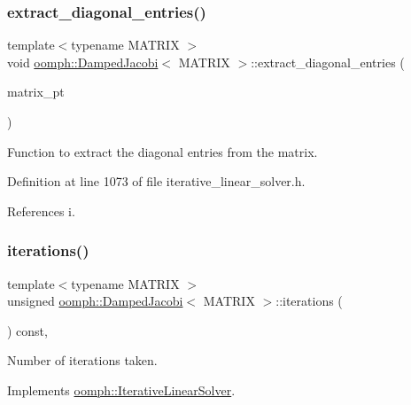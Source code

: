 \subsubsection{\texorpdfstring{extract\+\_\+diagonal\+\_\+entries()}{extract\_diagonal\_entries()}}
{\footnotesize\ttfamily template$<$typename M\+A\+T\+R\+IX $>$ \\
void \hyperlink{classoomph_1_1DampedJacobi}{oomph\+::\+Damped\+Jacobi}$<$ M\+A\+T\+R\+IX $>$\+::extract\+\_\+diagonal\+\_\+entries (\begin{DoxyParamCaption}\item[{\hyperlink{classoomph_1_1DoubleMatrixBase}{Double\+Matrix\+Base} $\ast$}]{matrix\+\_\+pt }\end{DoxyParamCaption})\hspace{0.3cm}{\ttfamily [inline]}}



Function to extract the diagonal entries from the matrix. 



Definition at line 1073 of file iterative\+\_\+linear\+\_\+solver.\+h.



References i.

\mbox{\label{classoomph_1_1DampedJacobi_aa72fe9dcf19728a8b5a75f0cadb36013}} 
\subsubsection{\texorpdfstring{iterations()}{iterations()}}
{\footnotesize\ttfamily template$<$typename M\+A\+T\+R\+IX $>$ \\
unsigned \hyperlink{classoomph_1_1DampedJacobi}{oomph\+::\+Damped\+Jacobi}$<$ M\+A\+T\+R\+IX $>$\+::iterations (\begin{DoxyParamCaption}{ }\end{DoxyParamCaption}) const\hspace{0.3cm}{\ttfamily [inline]}, {\ttfamily [virtual]}}



Number of iterations taken. 



Implements \hyperlink{classoomph_1_1IterativeLinearSolver_a5fe7f7b5e4847fdbd4f95d3875ec7a46}{oomph\+::\+Iterative\+Linear\+Solver}.



